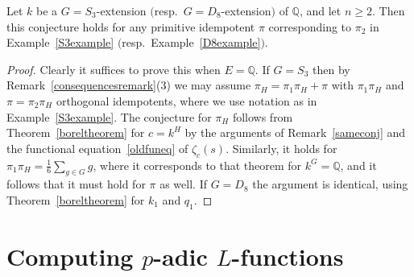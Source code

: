 \documentclass{amsart}
\begin{document}
\begin{proposition}\label{grossprop}
Let $ k $ be a $ G=S_3 $-extension $($resp.\  $ G= D_8 $-extension$)$ of $ {\mathbb Q} $, and let $ n \ge 2 $.
Then this conjecture holds for any primitive idempotent $ \pi $ corresponding to $ \pi_2 $ in
Example~\ref{S3example} $($resp.\ Example~\ref{D8example}$)$.
\end{proposition}

\begin{proof}
Clearly it suffices to prove this when $ E={\mathbb Q} $.
If $ G=S_3 $ then by Remark~\ref{consequencesremark}(3) we may assume
$ \pi_H = \pi_1 \pi_H + \pi $ with $ \pi_1 \pi_H $ and $ \pi = \pi_2 \pi_H $
orthogonal idempotents, where we use notation as in Example~\ref{S3example}.  The conjecture for $ \pi_H $
follows from Theorem~\ref{boreltheorem} for $ c = k^H $ by the arguments of Remark~\ref{sameconj} and
the functional equation~\eqref{oldfuneq} of $ {\zeta}_c(s) $.
Similarly, it holds for $ \pi_1 \pi_H = \frac16 \sum_{g \in G} g $,
where it corresponds to that theorem for $ k^G = {\mathbb Q} $,
and it follows that it must hold for $ \pi $ as well.
If $ G=D_8 $ the argument is identical, using
Theorem~\ref{boreltheorem} for $ k_1 $ and $ q_1 $.
\end{proof}

\section{Computing {$p$-adic{\futurelet{}}} {$L$-functions{\futurelet{}}}}
\label{pLsection}
\end{document}
